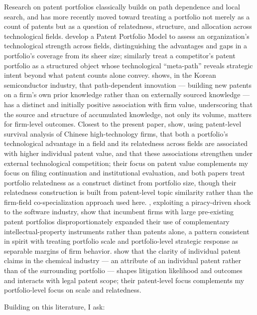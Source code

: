 \documentclass[12pt]{article}
\begin{document}
Research on patent portfolios classically builds on path dependence and local search, and has more recently moved toward treating a portfolio not merely as a count of patents but as a question of relatedness, structure, and allocation across technological fields. \citet{lishuying2020} develop a Patent Portfolio Model to assess an organization's technological strength across fields, distinguishing the advantages and gaps in a portfolio's coverage from its sheer size; \citet{zhai2021} similarly treat a competitor's patent portfolio as a structured object whose technological ``meta-path'' reveals strategic intent beyond what patent counts alone convey. \citet{choy2020} shows, in the Korean semiconductor industry, that path-dependent innovation --- building new patents on a firm's own prior knowledge rather than on externally sourced knowledge --- has a distinct and initially positive association with firm value, underscoring that the source and structure of accumulated knowledge, not only its volume, matters for firm-level outcomes. Closest to the present paper, \citet{lilanhua2025} show, using patent-level survival analysis of Chinese high-technology firms, that both a portfolio's technological advantage in a field and its relatedness across fields are associated with higher individual patent value, and that these associations strengthen under external technological competition; their focus on patent value complements my focus on filing continuation and institutional evaluation, and both papers treat portfolio relatedness as a construct distinct from portfolio size, though their relatedness construction is built from patent-level topic similarity rather than the firm-field co-specialization approach used here. \citet{bradleykolev2023}, exploiting a piracy-driven shock to the software industry, show that incumbent firms with large pre-existing patent portfolios disproportionately expanded their use of complementary intellectual-property instruments rather than patents alone, a pattern consistent in spirit with treating portfolio scale and portfolio-level strategic response as separable margins of firm behavior. \citet{sternitzkewalter2026} show that the clarity of individual patent claims in the chemical industry --- an attribute of an individual patent rather than of the surrounding portfolio --- shapes litigation likelihood and outcomes and interacts with legal patent scope; their patent-level focus complements my portfolio-level focus on scale and relatedness.

Building on this literature, I ask:
\end{document}
